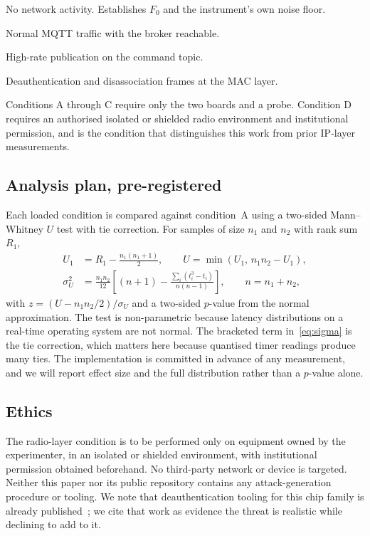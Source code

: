 \begin{description}[leftmargin=1.6em,itemsep=0.15em]
\item[A. Idle.] No network activity. Establishes $F_{0}$ and the instrument's own noise floor.
\item[B. Legitimate load.] Normal MQTT traffic with the broker reachable.
\item[C. Command-interface stress.] High-rate publication on the command topic.
\item[D. Radio-layer stress.] Deauthentication and disassociation frames at the MAC layer.
\end{description}

Conditions A through C require only the two boards and a probe. Condition D requires an
authorised isolated or shielded radio environment and institutional permission, and is the
condition that distinguishes this work from prior IP-layer measurements.

\subsection{Analysis plan, pre-registered}

Each loaded condition is compared against condition~A using a two-sided Mann--Whitney $U$ test
with tie correction. For samples of size $n_1$ and $n_2$ with rank sum $R_1$,
\begin{align}
U_1 &= R_1 - \frac{n_1(n_1+1)}{2}, \qquad U = \min(U_1,\, n_1 n_2 - U_1), \label{eq:u}\\
\sigma_U^2 &= \frac{n_1 n_2}{12}\left[(n+1) - \frac{\sum_i (t_i^3 - t_i)}{n(n-1)}\right],
\qquad n = n_1 + n_2, \label{eq:sigma}
\end{align}
with $z = (U - n_1 n_2 / 2)/\sigma_U$ and a two-sided $p$-value from the normal approximation.
The test is non-parametric because latency distributions on a real-time operating system are not
normal. The bracketed term in~\eqref{eq:sigma} is the tie correction, which matters here because
quantised timer readings produce many ties. The implementation is committed in advance of any
measurement, and we will report effect size and the full distribution rather than a $p$-value
alone.

\subsection{Ethics}

The radio-layer condition is to be performed only on equipment owned by the experimenter, in an
isolated or shielded environment, with institutional permission obtained beforehand. No
third-party network or device is targeted. Neither this paper nor its public repository contains
any attack-generation procedure or tooling. We note that deauthentication tooling for this chip
family is already published~\cite{deauther2026,espwn2023}; we cite that work as evidence the
threat is realistic while declining to add to it.

